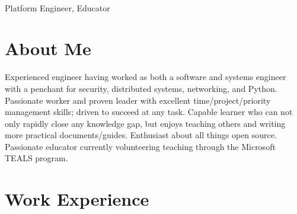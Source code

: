 \documentclass[10pt]{article} %
\begin{document}
\color{text1} %


\par{\\ %
{\color{headings} Platform Engineer, Educator}\\[15pt]\par} 
	

\begin{minipage}[t]{0.5\textwidth} %
\vspace{0pt} %
	
\section{About Me}
Experienced engineer having worked as both a software and systems engineer with a penchant for security, distributed systems, networking, and Python. Passionate worker and proven leader with excellent time/project/priority management skills; driven to succeed at any task. Capable learner who can not only rapidly close any knowledge gap, but enjoys teaching others and writing more practical documents/guides. Enthusiast about all things open source. Passionate educator currently volunteering teaching through the Microsoft TEALS program.


\section{Work Experience} 



\end{minipage}
\end{document}
